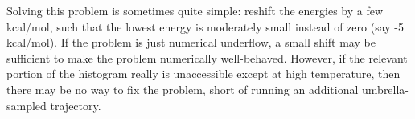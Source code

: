 \documentclass[12pt]{article}
\begin{document}
Solving this problem is sometimes quite simple: reshift the energies by a few
kcal/mol, such that the lowest energy is moderately small instead of zero
(say -5 kcal/mol).  If the problem is just numerical underflow, a small shift
may be sufficient to make the problem numerically well-behaved.  However, if
the relevant portion of the histogram really is unaccessible except at high
temperature, then there may be no way to fix the problem, short of running an
additional umbrella-sampled trajectory.
\end{document}

